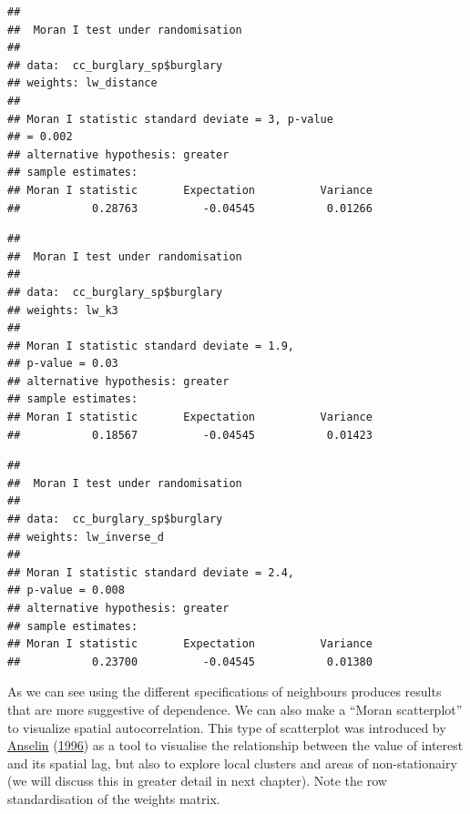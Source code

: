 \documentclass[
  krantz2]{krantz}
\makeatletter
\newenvironment{Shaded}{\begin{snugshade}}{\end{snugshade}}
\newcommand{\FunctionTok}[1]{\textcolor[rgb]{0,0,0}{#1}}
\newcommand{\NormalTok}[1]{#1}
\newcommand{\SpecialCharTok}[1]{\textcolor[rgb]{0,0,0}{#1}}
\newenvironment{kframe}{%
\medskip{}
\setlength{\fboxsep}{.8em}
 \def\at@end@of@kframe{}%
 \ifinner\ifhmode%
  \def\at@end@of@kframe{\end{minipage}}%
  \begin{minipage}{\columnwidth}%
 \fi\fi%
 \def\FrameCommand##1{\hskip\@totalleftmargin \hskip-\fboxsep
 \colorbox{shadecolor}{##1}\hskip-\fboxsep
     \hskip-\linewidth \hskip-\@totalleftmargin \hskip\columnwidth}%
 \MakeFramed {\advance\hsize-\width
   \@totalleftmargin\z@ \linewidth\hsize
   \@setminipage}}%
 {\par\unskip\endMakeFramed%
 \at@end@of@kframe}
\renewenvironment{Shaded}{\begin{kframe}}{\end{kframe}}
\makeatother
\begin{document}
\begin{verbatim}
## 
##  Moran I test under randomisation
## 
## data:  cc_burglary_sp$burglary  
## weights: lw_distance    
## 
## Moran I statistic standard deviate = 3, p-value
## = 0.002
## alternative hypothesis: greater
## sample estimates:
## Moran I statistic       Expectation          Variance 
##           0.28763          -0.04545           0.01266
\end{verbatim}

\begin{Shaded}
\end{Shaded}

\begin{verbatim}
## 
##  Moran I test under randomisation
## 
## data:  cc_burglary_sp$burglary  
## weights: lw_k3    
## 
## Moran I statistic standard deviate = 1.9,
## p-value = 0.03
## alternative hypothesis: greater
## sample estimates:
## Moran I statistic       Expectation          Variance 
##           0.18567          -0.04545           0.01423
\end{verbatim}

\begin{Shaded}
\end{Shaded}

\begin{verbatim}
## 
##  Moran I test under randomisation
## 
## data:  cc_burglary_sp$burglary  
## weights: lw_inverse_d    
## 
## Moran I statistic standard deviate = 2.4,
## p-value = 0.008
## alternative hypothesis: greater
## sample estimates:
## Moran I statistic       Expectation          Variance 
##           0.23700          -0.04545           0.01380
\end{verbatim}

As we can see using the different specifications of neighbours produces results that are more suggestive of dependence. We can also make a ``Moran scatterplot'' to visualize spatial autocorrelation. This type of scatterplot was introduced by \protect\hyperlink{ref-Anselin_1996}{Anselin} (\protect\hyperlink{ref-Anselin_1996}{1996}) as a tool to visualise the relationship between the value of interest and its spatial lag, but also to explore local clusters and areas of non-stationairy (we will discuss this in greater detail in next chapter). Note the row standardisation of the weights matrix.
\end{document}
